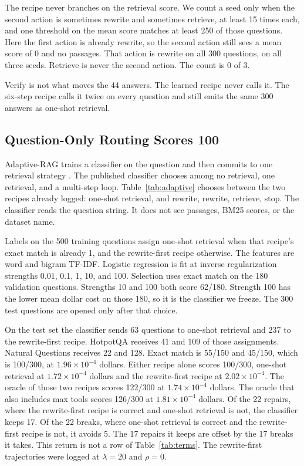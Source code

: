 \documentclass[letterpaper]{article} %
\begin{document}
The recipe never branches on the retrieval score. We count a seed only when the second action is sometimes rewrite and sometimes retrieve, at least 15 times each, and one threshold on the mean score matches at least 250 of those questions. Here the first action is already rewrite, so the second action still sees a mean score of 0 and no passages. That action is rewrite on all 300 questions, on all three seeds. Retrieve is never the second action. The count is 0 of 3.

Verify is not what moves the 44 answers. The learned recipe never calls it. The six-step recipe calls it twice on every question and still emits the same 300 answers as one-shot retrieval.

\subsection{Question-Only Routing Scores 100}
Adaptive-RAG trains a classifier on the question and then commits to one retrieval strategy \cite{jeong2024adaptive}. The published classifier chooses among no retrieval, one retrieval, and a multi-step loop. Table~\ref{tab:adaptive} chooses between the two recipes already logged: one-shot retrieval, and rewrite, rewrite, retrieve, stop. The classifier reads the question string. It does not see passages, BM25 scores, or the dataset name.

Labels on the 500 training questions assign one-shot retrieval when that recipe's exact match is already 1, and the rewrite-first recipe otherwise. The features are word and bigram TF-IDF. Logistic regression is fit at inverse regularization strengths 0.01, 0.1, 1, 10, and 100. Selection uses exact match on the 180 validation questions. Strengths 10 and 100 both score 62/180. Strength 100 has the lower mean dollar cost on those 180, so it is the classifier we freeze. The 300 test questions are opened only after that choice.

On the test set the classifier sends 63 questions to one-shot retrieval and 237 to the rewrite-first recipe. HotpotQA receives 41 and 109 of those assignments. Natural Questions receives 22 and 128. Exact match is 55/150 and 45/150, which is 100/300, at \(1.96\times 10^{-4}\) dollars. Either recipe alone scores 100/300, one-shot retrieval at \(1.72\times 10^{-4}\) dollars and the rewrite-first recipe at \(2.02\times 10^{-4}\). The oracle of those two recipes scores 122/300 at \(1.74\times 10^{-4}\) dollars. The oracle that also includes max tools scores 126/300 at \(1.81\times 10^{-4}\) dollars. Of the 22 repairs, where the rewrite-first recipe is correct and one-shot retrieval is not, the classifier keeps 17. Of the 22 breaks, where one-shot retrieval is correct and the rewrite-first recipe is not, it avoids 5. The 17 repairs it keeps are offset by the 17 breaks it takes. This return is not a row of Table~\ref{tab:terms}. The rewrite-first trajectories were logged at \(\lambda{=}20\) and \(\rho{=}0\).
\end{document}
